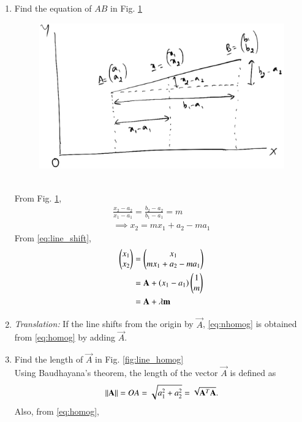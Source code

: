 \begin{enumerate}[label=\arabic*.,ref=\thesubsection.\theenumi]
\item Find the equation of $AB$ in Fig. \ref{fig:line_nhomog}
\begin{figure}
\centering
\includegraphics[width=\columnwidth]{./line/figs/line_nhomog.eps}
\caption{}
\label{fig:line_nhomog}
\end{figure}
\\
\solution 
From Fig. \ref{fig:line_nhomog}, 
%
\begin{align}
\frac{x_2-a_2}{x_1-a_1} = \frac{b_2-a_2}{b_1-a_1} = m
\\
\implies x_2 = m x_1 + a_2-ma_1
\label{eq:line_shift}
\end{align}
%
From \eqref{eq:line_shift},
\begin{align}
\begin{pmatrix}x_1 \\ x_2\end{pmatrix} &= 
\begin{pmatrix}x_1 \\   m x_1 + a_2-ma_1
\end{pmatrix} 
\\
&=\mathbf{A} + \left(x_1-a_1\right)  \begin{pmatrix}1 \\ m\end{pmatrix}
\\
&=\mathbf{A} + \lambda  \mathbf{m}
\label{eq:nhomog}
\end{align}
\item {\em Translation:} If the line shifts from the origin by $\vec{A}$, \eqref{eq:nhomog} is obtained from \eqref{eq:homog} by adding $\vec{A}$.
\item Find the length of $\vec{A}$ in Fig. \ref{fig:line_homog}
\\
\solution Using Baudhayana's theorem, the length of the vector $\vec{A}$ is defined as
\begin{equation}
 \left\lVert\mathbf{A}\right\rVert = OA = \sqrt{a_1^2 + a_2^2}
=\sqrt{\mathbf{A}^T\mathbf{A}}.
\end{equation}
%
Also, from \eqref{eq:homog}, 
\begin{equation}

\end{equation}
\end{enumerate}
